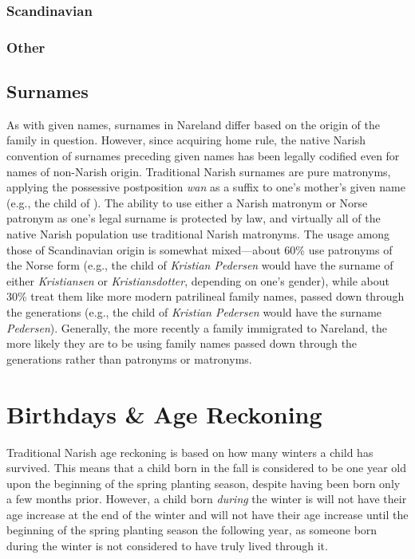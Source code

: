 \documentclass[a4paper,11pt,twoside,openright]{memoir}
\begin{document}
\subsection{Scandinavian}

\subsection{Other}

\section{Surnames}

As with given names, surnames in Nareland differ based on the origin of the family in question. However, since acquiring home rule, the native Narish convention of surnames preceding given names has been legally codified even for names of non-Narish origin. Traditional Narish surnames are pure matronyms, applying the possessive postposition \textit{wan} as a suffix to one's mother's given name (e.g., the child of \textit{}). The ability to use either a Narish matronym or Norse patronym as one's legal surname is protected by law, and virtually all of the native Narish population use traditional Narish matronyms. The usage among those of Scandinavian origin is somewhat mixed---about 60\% use patronyms of the Norse form (e.g., the child of \textit{Kristian Pedersen} would have the surname of either \textit{Kristiansen} or \textit{Kristiansdotter}, depending on one's gender), while about 30\% treat them like more modern patrilineal family names, passed down through the generations (e.g., the child of \textit{Kristian Pedersen} would have the surname \textit{Pedersen}). Generally, the more recently a family immigrated to Nareland, the more likely they are to be using family names passed down through the generations rather than patronyms or matronyms.




\chapter{Birthdays \& Age Reckoning}

Traditional Narish age reckoning is based on how many winters a child has survived. This means that a child born in the fall is considered to be one year old upon the beginning of the spring planting season, despite having been born only a few months prior. However, a child born \emph{during} the winter is will not have their age increase at the end of the winter and will not have their age increase until the beginning of the spring planting season the following year, as someone born during the winter is not considered to have truly lived through it.
\end{document}
